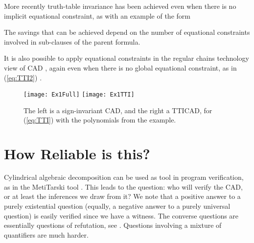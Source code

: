 \documentclass[runningheads,a4paper]{llncs}
\begin{document}
\vspace*{0.1in}

More recently \cite{Bradfordetal2014a} truth-table invariance has been achieved even when there is no implicit equational constraint, as with an example of the form 

The savings that can be achieved depend on the number of equational constraints involved in sub-clauses of the parent formula.
\par
It is also possible to apply equational constraints in the regular chains technology view of CAD \cite{ChenMorenoMaza2012a}, again even when there is no global equational constraint, as in (\ref{eq:TTI2}) \cite{Bradfordetal2014b}. 

\begin{figure}[t]
\caption{The left is a sign-invariant CAD, and the right a TTICAD, for (\ref{eq:TTI}) with the polynomials from the example.}
\label{fig:Ex1}
\centering
\texttt{[image: Ex1Full]}
\hspace*{0.02\textwidth}
\texttt{[image: Ex1TTI]}
\end{figure}

\section{How Reliable is this?}

Cylindrical algebraic decomposition can be used as tool in program verification, as in the MetiTarski tool \cite{Paulson2012b}. This leads to the question: who will verify the CAD, or at least the inferences we draw from it?  We note that a positive answer to a purely existential question (equally, a negative answer to a purely universal question) is easily verified since we have a witness. The converse questions are essentially questions of refutation, see \cite{JovanovicdeMoura2012a}. Questions involving a mixture of quantifiers are much harder.
\end{document}

